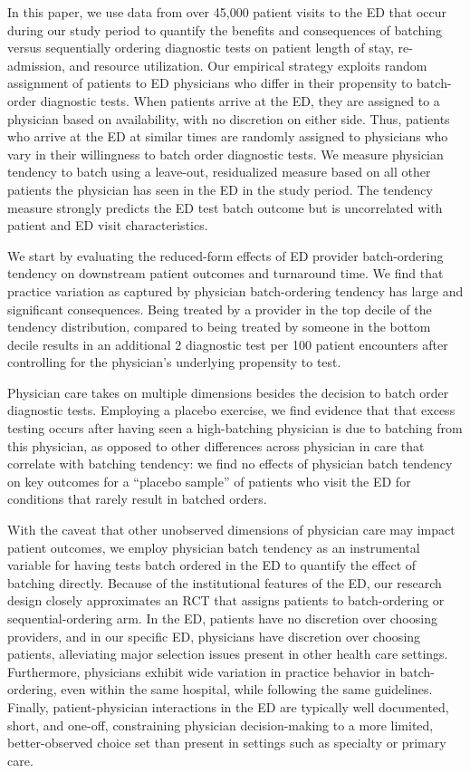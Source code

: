 \documentclass[,,nonblindrev]{informs}
\begin{document}
In this paper, we use data from over 45,000 patient visits to the ED
that occur during our study period to quantify the benefits and
consequences of batching versus sequentially ordering diagnostic tests
on patient length of stay, re-admission, and resource utilization. Our
empirical strategy exploits random assignment of patients to ED
physicians who differ in their propensity to batch-order diagnostic
tests. When patients arrive at the ED, they are assigned to a physician
based on availability, with no discretion on either side. Thus, patients
who arrive at the ED at similar times are randomly assigned to
physicians who vary in their willingness to batch order diagnostic
tests. We measure physician tendency to batch using a leave-out,
residualized measure based on all other patients the physician has seen
in the ED in the study period. The tendency measure strongly predicts
the ED test batch outcome but is uncorrelated with patient and ED visit
characteristics.

We start by evaluating the reduced-form effects of ED provider
batch-ordering tendency on downstream patient outcomes and turnaround
time. We find that practice variation as captured by physician
batch-ordering tendency has large and significant consequences. Being
treated by a provider in the top decile of the tendency distribution,
compared to being treated by someone in the bottom decile results in an
additional 2 diagnostic test per 100 patient encounters after
controlling for the physician's underlying propensity to test.

Physician care takes on multiple dimensions besides the decision to
batch order diagnostic tests. Employing a placebo exercise, we find
evidence that that excess testing occurs after having seen a
high-batching physician is due to batching from this physician, as
opposed to other differences across physician in care that correlate
with batching tendency: we find no effects of physician batch tendency
on key outcomes for a ``placebo sample'' of patients who visit the ED
for conditions that rarely result in batched orders.

With the caveat that other unobserved dimensions of physician care may
impact patient outcomes, we employ physician batch tendency as an
instrumental variable for having tests batch ordered in the ED to
quantify the effect of batching directly. Because of the institutional
features of the ED, our research design closely approximates an RCT that
assigns patients to batch-ordering or sequential-ordering arm. In the
ED, patients have no discretion over choosing providers, and in our
specific ED, physicians have discretion over choosing patients,
alleviating major selection issues present in other health care
settings. Furthermore, physicians exhibit wide variation in practice
behavior in batch-ordering, even within the same hospital, while
following the same guidelines. Finally, patient-physician interactions
in the ED are typically well documented, short, and one-off,
constraining physician decision-making to a more limited,
better-observed choice set than present in settings such as specialty or
primary care.
\end{document}
